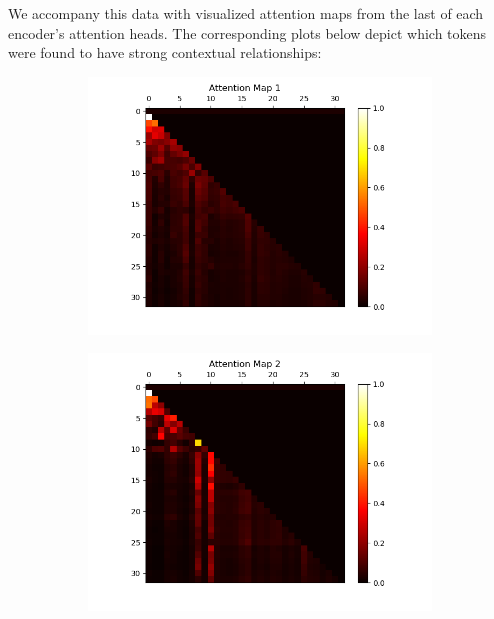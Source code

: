 \documentclass[10pt]{article}
\theoremstyle{definition}
\begin{document}
\noindent We accompany this data with visualized attention maps from the last of each encoder's attention heads. The corresponding plots below depict which tokens were found to have strong contextual relationships:

\begin{figure}[H]
    \centering
    \begin{subfigure}[b]{0.35\textwidth}
        \centering
        \includegraphics[width=\textwidth]{../data/plots/part2/attention_map_1.png}
        \label{subfig:am1}
    \end{subfigure}
    \begin{subfigure}[b]{0.35\textwidth}
        \centering
        \includegraphics[width=\textwidth]{../data/plots/part2/attention_map_2.png}

\end{subfigure}
\end{figure}
\end{document}

